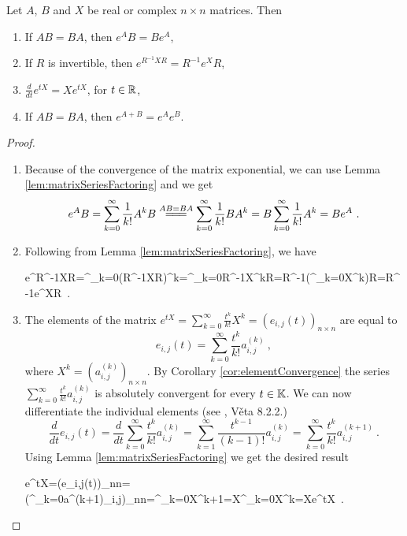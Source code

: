 \begin{lemma}
\label{lem:expprop}
	Let $A$, $B$ and $X$ be real or complex $n\times n$ matrices. Then 
	\begin{enumerate}
		\item If $AB = BA$, then $e^{A}B = Be^{A}$,
		\item If $R$ is invertible, then $e^{R^{-1}XR}=R^{-1}e^XR$,
		\item $\frac{d}{dt}e^{tX}=Xe^{tX}$, for $t \in \mathbb{R}$,
		\item If $AB = BA$, then $e^{A+B} = e^{A}e^B$.
	\end{enumerate}
\end{lemma}

\begin{proof}
	\begin{enumerate}
		\item
		Because of the convergence of the matrix exponential, we can use Lemma \ref{lem:matrixSeriesFactoring} and we get
		$$e^{A}B=\sum^\infty_{k=0}\frac{1}{k!}A^{k}B\stackrel{AB=BA}{=\joinrel=\joinrel=}\sum^\infty_{k=0}\frac{1}{k!}BA^{k}=B\sum^\infty_{k=0}\frac{1}{k!}A^{k}=Be^{A}\ .$$
		
		\item Following from Lemma \ref{lem:matrixSeriesFactoring}, we have 
		\begin{longeq}
			e^{R^{-1}XR}=\sum^\infty_{k=0}(R^{-1}XR)^{k}=\sum^\infty_{k=0}R^{-1}X^{k}R=R^{-1}\left(\sum^\infty_{k=0}X^{k}\right)R=R^{-1}e^{X}R\ . 
		\end{longeq}

		\item The elements of the matrix $e^{tX}=\sum^\infty_{k=0}\frac{t^k}{k!}X^{k}=(e_{i,j}(t))_{n\times n}$ are equal to
		$$e_{i,j}(t)=\sum^\infty_{k=0}\frac{t^k}{k!}a^{(k)}_{i,j}\ ,$$
		where $X^k=(a^{(k)}_{i,j})_{n\times n}$. By Corollary \ref{cor:elementConvergence} the series $\sum^\infty_{k=0}\frac{t^k}{k!}a^{(k)}_{i,j}$ is absolutely convergent for every $t\in\mathbb{K}$. We can now differentiate the individual elements (see \cite{Pick}, Věta 8.2.2.)
		$$\frac{d}{dt}e_{i,j}(t)=\frac{d}{dt}\sum^\infty_{k=0}\frac{t^k}{k!}a^{(k)}_{i,j}=\sum^\infty_{k=1}\frac{t^{k-1}}{(k-1)!}a^{(k)}_{i,j}=\sum^\infty_{k=0}\frac{t^{k}}{k!}a^{(k+1)}_{i,j}\ .$$ 
		Using Lemma \ref{lem:matrixSeriesFactoring} we get the desired result
		\begin{longeq}
			e^{tX}=\left(e_{i,j}(t)\right)_{n\times n}=\left(\sum^\infty_{k=0}a^{(k+1)}_{i,j}\right)_{n\times n}=\sum^\infty_{k=0}X^{k+1}=X\sum^\infty_{k=0}X^{k}=Xe^{tX}\ .
		\end{longeq}


\end{enumerate}
\end{proof}

